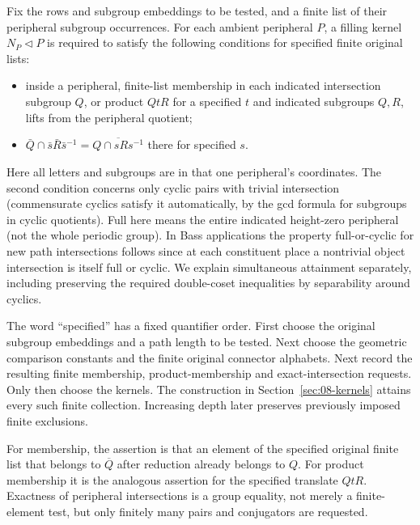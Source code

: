 \begin{definition}\label{transfer:finite-tests}
Fix the rows and subgroup embeddings to be tested, and a finite list of their peripheral subgroup occurrences. For each ambient peripheral \(P\), a filling kernel \(N_P\lhd P\) is required to satisfy the following conditions for specified finite original lists:
\begin{itemize}
\item inside a peripheral, finite-list membership in each indicated intersection subgroup \(Q\), or product \(Q t R\) for a specified \(t\) and indicated subgroups \(Q,R\), lifts from the peripheral quotient;
\item \(\bar Q\cap \bar s\bar R\bar s^{-1}=\overline{Q\cap sRs^{-1}}\) there for specified \(s\).
\end{itemize}
\end{definition}
Here all letters and subgroups are in that one peripheral's coordinates. The second condition concerns only cyclic pairs with trivial intersection (commensurate cyclics satisfy it automatically, by the gcd formula for subgroups in cyclic quotients). Full here means the entire indicated height-zero peripheral (not the whole periodic group). In Bass applications the property full-or-cyclic for new path intersections follows since at each constituent place a nontrivial object intersection is itself full or cyclic. We explain simultaneous attainment separately, including preserving the required double-coset inequalities by separability around cyclics.

The word ``specified'' has a fixed quantifier order. First choose the original subgroup embeddings and a path length to be tested. Next choose the geometric comparison constants and the finite original connector alphabets. Next record the resulting finite membership, product-membership and exact-intersection requests. Only then choose the kernels. The construction in Section~\ref{sec:08-kernels} attains every such finite collection. Increasing depth later preserves previously imposed finite exclusions.

For membership, the assertion is that an element of the specified original finite list that belongs to \(\overline Q\) after reduction already belongs to \(Q\). For product membership it is the analogous assertion for the specified translate \(QtR\). Exactness of peripheral intersections is a group equality, not merely a finite-element test, but only finitely many pairs and conjugators are requested.

